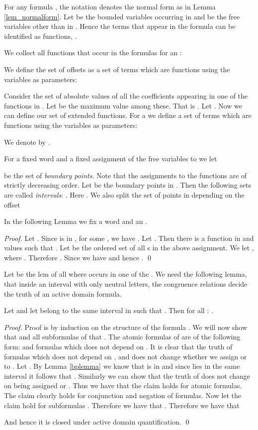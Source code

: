 \documentclass[envcountsame]{llncs}
\begin{document}
For any formula , the notation  denotes the normal form as in Lemma \ref{lem_normalform}.
Let  be the bounded variables occurring in  and   be the free variables other than  in .
Hence the terms  that appear in the formula  can be identified as functions, .

We collect all functions  that occur in the formulas  for an :  

We define the set  of offsets as a set of terms which are functions using the variables  as parameters:

Consider the set of absolute values of all the coefficients appearing in one of the functions in . Let  be the maximum value among these. That is 
. Let .
Now we can define our set of extended functions.
For a  we define a set of terms which are functions using the variables  as parameters:

We denote by .

For a fixed word  and a fixed assignment of the free variables  to  we let 

be the set of {\em boundary points}. Note that the assignments to the functions are of strictly decreasing order. Let  be the boundary points 
in . Then the following sets are called \emph{intervals}: . Here 
.
We also split the set of points in  depending on the offset




In the following Lemma we fix a word  and an .
\begin{lemma}\label{bplemma}

\end{lemma}
\begin{proof}
Let . 
Since  is in , for some , we have . Let . Then there is a function
 in  and values  such that . Let  be the ordered set of all s in the above assignment. We let , where 
. Therefore .
Since  we have  and hence .
\qed \end{proof}

Let  be the lcm of all  where  occurs in one of the . We need the following lemma, that inside an interval with only neutral letters, the congruence relations decide the truth of an active domain formula. 
\begin{lemma}
\label{lem_witInIntrv}
Let  and let  belong to the same interval in  such that . Then for all :
.
\end{lemma}
\begin{proof}
Proof is by induction on the structure of the formula . We will now show that  and all
subformulas  of  that . The atomic formulas of  are of the following form:  and formulas which does not depend on . It is clear that the truth of formulas which
does not depend on ,  and  does not change whether we assign  or  to . Let .
By Lemma \ref{bplemma} we know that  is in  and since  lies in the same interval it follows that . Similarly we can show that the truth of  does not change on 
being assigned  or . Thus we have that the claim holds for atomic formulas.
The claim clearly holds for conjunction and negation of formulas. Now let the claim hold for subformulas . Therefore  we have that
.
Therefore we have that

And hence it is closed under active domain quantification.
\qed \end{proof}
\end{document}

